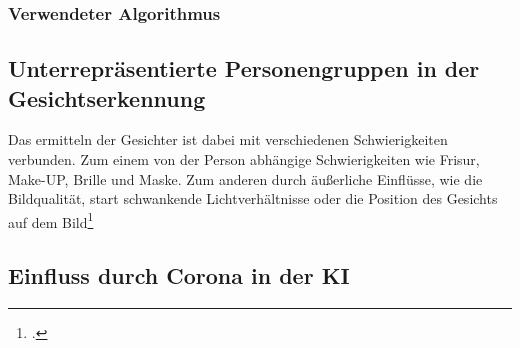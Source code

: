 \subsubsection{Verwendeter Algorithmus}



\subsection{Unterrepräsentierte Personengruppen in der Gesichtserkennung}
Das ermitteln der Gesichter ist dabei mit verschiedenen Schwierigkeiten verbunden. Zum einem von der Person abhängige Schwierigkeiten wie Frisur, Make-UP, Brille und Maske. Zum anderen durch äußerliche Einflüsse, wie die Bildqualität, start schwankende Lichtverhältnisse oder die Position des Gesichts auf dem Bild\footcite[Vgl. ][Seite 150]{paas_was_2020}


\subsection{Einfluss durch Corona in der KI}
